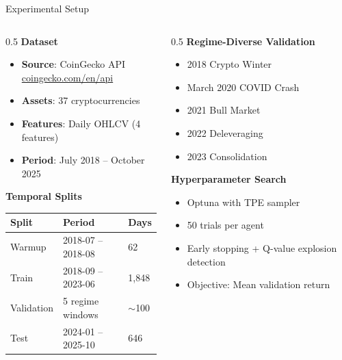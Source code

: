 \documentclass[aspectratio=169]{beamer}
\begin{document}
\begin{frame}{Experimental Setup}
\small

\begin{columns}[T,totalwidth=\textwidth]
\begin{column}{0.5\textwidth}
\textbf{Dataset}
\begin{itemize}\setlength{\itemsep}{3pt}
  \item \textbf{Source}: CoinGecko API\\{\scriptsize\url{coingecko.com/en/api}}
  \item \textbf{Assets}: 37 cryptocurrencies
  \item \textbf{Features}: Daily OHLCV (4 features)
  \item \textbf{Period}: July 2018 -- October 2025
\end{itemize}

\vspace{0.3em}
\textbf{Temporal Splits}
\begin{table}[h]
\footnotesize
\begin{tabular}{lll}
\toprule
\textbf{Split} & \textbf{Period} & \textbf{Days} \\
\midrule
Warmup & 2018-07 -- 2018-08 & 62 \\
Train & 2018-09 -- 2023-06 & 1,848 \\
Validation & 5 regime windows & $\sim$100 \\
Test & 2024-01 -- 2025-10 & 646 \\
\bottomrule
\end{tabular}
\end{table}
\end{column}

\begin{column}{0.5\textwidth}
\textbf{Regime-Diverse Validation}~\citep{jiang2017eIIE}
\begin{itemize}\setlength{\itemsep}{2pt}
  \item 2018 Crypto Winter
  \item March 2020 COVID Crash
  \item 2021 Bull Market
  \item 2022 Deleveraging
  \item 2023 Consolidation
\end{itemize}

\vspace{0.3em}
\textbf{Hyperparameter Search}
\begin{itemize}\setlength{\itemsep}{2pt}
  \item Optuna with TPE sampler
  \item 50 trials per agent
  \item Early stopping + Q-value explosion detection
  \item Objective: Mean validation return
\end{itemize}
\end{column}
\end{columns}

\end{frame}
\end{document}
